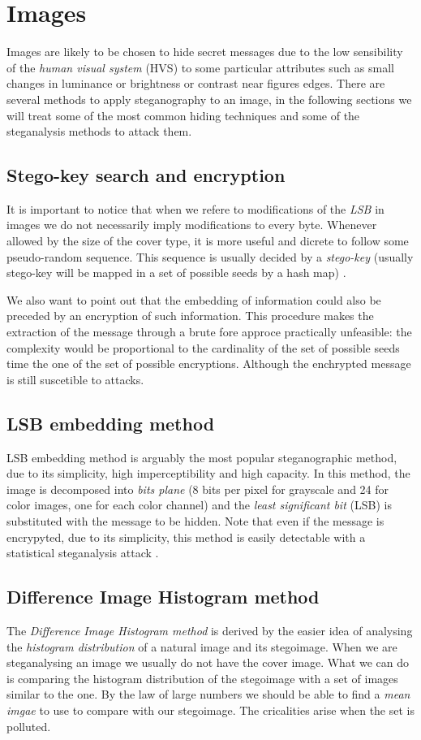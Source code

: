 \documentclass[../../main.tex]{subfiles}
\begin{document}
    
\section{Images}
Images are likely to be chosen to hide secret messages due to the low
sensibility of the \emph{human visual system} (HVS) to some particular
attributes such as small changes in luminance or brightness or contrast near
figures edges.
There are several methods to apply steganography to an image, in the
following sections we will treat some of the most common hiding techniques
and some of the steganalysis methods to attack them.

\subsection{Stego-key search and encryption}

It is important to notice that when we refere to modifications of the \emph{LSB} in images we
do not necessarily imply modifications to every byte. Whenever allowed by the size of the cover type, it is 
more useful and dicrete to follow some pseudo-random sequence. This sequence is usually decided by a \emph{stego-key} (usually stego-key will be mapped in a set of possible
seeds by a hash map) \cite{stego-key}.

We also want to point out that the embedding of information could also be preceded by an encryption of such information.
This procedure makes the extraction of the message through a brute fore approce practically unfeasible: the complexity would
be proportional to the cardinality of the set of possible seeds time the
one of the set of possible encryptions. Although the enchrypted message is still suscetible to attacks.

\subsection{LSB embedding method}
LSB embedding method is arguably the most popular steganographic method, due
to its simplicity, high imperceptibility and high capacity.
In this method, the image is decomposed into \emph{bits plane} (8 bits per
pixel for grayscale and 24 for color images, one for each color channel)
and the \emph{least significant bit} (LSB) is substituted with the message
to be hidden.
Note that even if the message is encrypyted, due to its simplicity, this
method is easily detectable with a statistical steganalysis attack
\cite{techniques-data-hiding}.

\subsection{Difference Image Histogram method}
The \emph{Difference Image Histogram method} is derived by the easier idea
of analysing the \emph{histogram distribution} of a natural image and its
stegoimage. When we are steganalysing an image we usually do not
have the cover image. What we can do is comparing the histogram
distribution of the stegoimage with a set of images similar to the one. 
By the law of large numbers we should be able to find a \emph{mean imgae} to use to compare with our stegoimage.
The cricalities arise when the set is polluted.
\cite{methodology-steganalysis-images}
\end{document}
